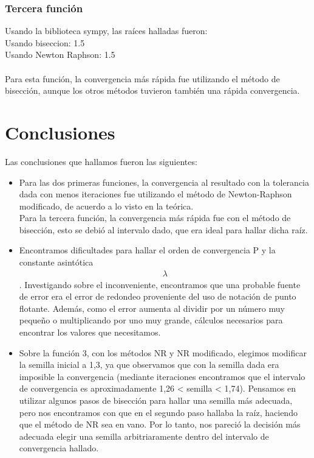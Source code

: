 \documentclass[titlepage,a4paper]{article}
\begin{document}
\subsubsection{Tercera función}\label{sec:CR3}
Usando la biblioteca sympy, las raíces halladas fueron:
\\Usando biseccion:  1.5
\\Usando Newton Raphson:  1.5
\\\\Para esta función, la convergencia más rápida fue utilizando el método de bisección, aunque los otros métodos tuvieron también una rápida convergencia.
\section{Conclusiones}\label{sec:conclusiones}
Las conclusiones que hallamos fueron las siguientes:
\begin{itemize}
\item Para las dos primeras funciones, la convergencia al resultado con la tolerancia dada con menos iteraciones fue utilizando el método de Newton-Raphson modificado, de acuerdo a lo visto en la teórica.
\\Para la tercera función, la convergencia más rápida fue con el método de bisección, esto se debió al intervalo dado, que era ideal para hallar dicha raíz.
\item Encontramos dificultades para hallar el orden de convergencia P y la constante asintótica \begin{align}
\lambda
\end{align}. Investigando sobre el inconveniente, encontramos que una probable fuente de error era el error de redondeo proveniente del uso de notación de punto flotante. Además,  como el error aumenta al dividir por un número muy pequeño o multiplicando por uno muy grande, cálculos necesarios para encontrar los valores que necesitamos.

\item Sobre la función 3, con los métodos NR y NR modificado, elegimos modificar la semilla inicial a 1,3, ya que observamos que con la semilla dada era imposible la convergencia (mediante iteraciones encontramos que el intervalo de convergencia es aproximadamente 1,26 < semilla < 1,74). Pensamos en utilizar algunos pasos de bisección para hallar una semilla más adecuada, pero nos encontramos con que en el segundo paso hallaba la raíz, haciendo que el método de NR sea en vano. Por lo tanto, nos pareció la decisión más adecuada elegir una semilla arbitriaramente dentro del intervalo de convergencia hallado.
\end{itemize}
\end{document}
